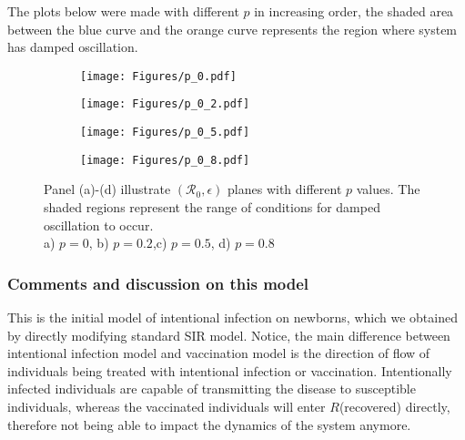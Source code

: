 \documentclass[12pt]{article}
\newcommand{\R}{\mathcal{R}}
\begin{document}
The plots below were made with different $p$ in increasing order, the shaded area between the blue curve and the orange curve represents the region where system has damped oscillation.

\begin{figure}[h]
\centering

\begin{subfigure}[t]{.4\textwidth}
\centering
\texttt{[image: Figures/p\_0.pdf]}
        \caption{}\label{fig:fig_a}
\end{subfigure}
%
\begin{subfigure}[t]{.4\textwidth}
\centering
\texttt{[image: Figures/p\_0\_2.pdf]}
\caption{}\label{fig:fig_b}
\end{subfigure}

\medskip

\begin{subfigure}[t]{.4\textwidth}
\centering
\vspace{0pt}%
\texttt{[image: Figures/p\_0\_5.pdf]}
\caption{}\label{fig:fig_c}
\end{subfigure}
%
\begin{subfigure}[t]{.4\textwidth}
\centering
\vspace{0pt}%
\texttt{[image: Figures/p\_0\_8.pdf]}
\caption{}\label{fig:fig_d}
\end{subfigure}
%
\begin{minipage}[t]{0.9\textwidth}
\caption{Panel (a)-(d) illustrate $(\R_0,\epsilon)$ planes with different $p$ values. The shaded regions represent the range of conditions for damped oscillation to occur.\\ a) $p=0$, b) $p=0.2$,c) $p=0.5$, d) $p=0.8$}
\end{minipage}
\end{figure}

\clearpage

\subsubsection{Comments and discussion on this model}
This is the initial model of intentional infection on newborns, which we obtained by directly modifying standard SIR model. Notice, the main difference between intentional infection model and vaccination model is the direction of flow of individuals being treated with intentional infection or vaccination. Intentionally infected individuals are capable of transmitting the disease to susceptible individuals, whereas the vaccinated individuals will enter $R$(recovered) directly, therefore not being able to impact the dynamics of the system anymore. 
\end{document}
